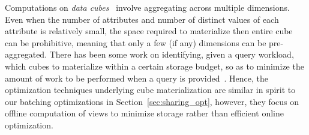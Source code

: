 Computations on {\em data cubes}~\cite{DBLP:jounral/DMKD/GrayCBLR97}
involve aggregating across multiple dimensions.
Even when the number of attributes and number
of distinct values of each attribute is relatively small,
the space required to materialize then entire cube can be prohibitive,
meaning that only a few (if any) dimensions can be pre-aggregated.
There has been some work on identifying, given a query workload,
which cubes to materialize within a certain storage budget,
so as to minimize the amount of work to be performed when a
query is provided~\cite{DBLP:conf/VLDB/AgarwalADG96,DBLP:conf/SIGMOD/HarinarayanRU96}.
Hence, the optimization techniques underlying cube materialization 
are similar in spirit to our batching optimizations in Section~\ref{sec:sharing_opt},
however, they focus on offline computation of views to minimize storage rather than efficient online
optimization.



